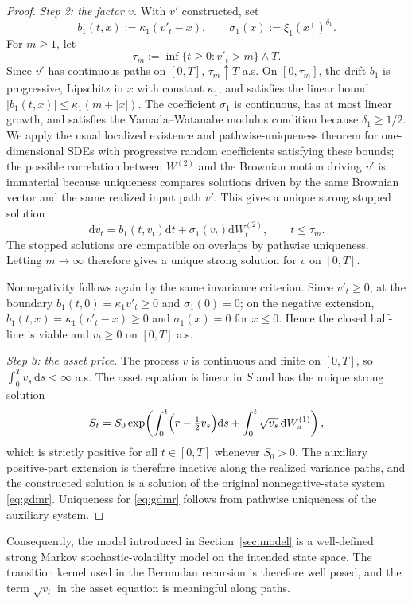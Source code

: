 \documentclass[10pt]{article}
\theoremstyle{plain}
\theoremstyle{definition}
\theoremstyle{remark}
\newcommand{\dd}{\mathrm d}
\begin{document}
\begin{proof}
\emph{Step 2: the factor $v$.}
With $v'$ constructed, set
\[
b_1(t,x):=\kappa_1(v'_t-x),\qquad \sigma_1(x):=\xi_1(x^+)^{\delta_1}.
\]
For $m\ge1$, let
\[
\tau_m:=\inf\{t\ge0:v'_t>m\}\wedge T.
\]
Since $v'$ has continuous paths on $[0,T]$, $\tau_m\uparrow T$ a.s. On $[0,\tau_m]$, the drift $b_1$ is progressive, Lipschitz in $x$ with constant $\kappa_1$, and satisfies the linear bound $|b_1(t,x)|\le\kappa_1(m+|x|)$. The coefficient $\sigma_1$ is continuous, has at most linear growth, and satisfies the Yamada--Watanabe modulus condition because $\delta_1\ge1/2$. We apply the usual localized existence and pathwise-uniqueness theorem for one-dimensional SDEs with progressive random coefficients satisfying these bounds; the possible correlation between $W^{(2)}$ and the Brownian motion driving $v'$ is immaterial because uniqueness compares solutions driven by the same Brownian vector and the same realized input path $v'$. This gives a unique strong stopped solution
\[
\dd v_t=b_1(t,v_t)\dd t+\sigma_1(v_t)\dd W^{(2)}_t,\qquad t\le\tau_m.
\]
The stopped solutions are compatible on overlaps by pathwise uniqueness. Letting $m\to\infty$ therefore gives a unique strong solution for $v$ on $[0,T]$.

Nonnegativity follows again by the same invariance criterion. Since $v'_t\ge0$, at the boundary $b_1(t,0)=\kappa_1v'_t\ge0$ and $\sigma_1(0)=0$; on the negative extension, $b_1(t,x)=\kappa_1(v'_t-x)\ge0$ and $\sigma_1(x)=0$ for $x\le0$. Hence the closed half-line is viable and $v_t\ge0$ on $[0,T]$ a.s.

\emph{Step 3: the asset price.}
The process $v$ is continuous and finite on $[0,T]$, so $\int_0^T v_s\,\dd s<\infty$ a.s. The asset equation is linear in $S$ and has the unique strong solution
\[
S_t
= S_0 \exp\!\left(
\int_0^t \Bigl(r-\tfrac12 v_s\Bigr)\dd s + \int_0^t \sqrt{v_s}\,\dd W^{(1)}_s
\right),
\]
which is strictly positive for all $t\in[0,T]$ whenever $S_0>0$. The auxiliary positive-part extension is therefore inactive along the realized variance paths, and the constructed solution is a solution of the original nonnegative-state system \eqref{eq:gdmr}. Uniqueness for \eqref{eq:gdmr} follows from pathwise uniqueness of the auxiliary system.
\end{proof}

Consequently, the model introduced in Section~\ref{sec:model} is a well-defined strong Markov stochastic-volatility model on the intended state space. The transition kernel used in the Bermudan recursion is therefore well posed, and the term $\sqrt{v_t}$ in the asset equation is meaningful along paths.
\end{document}

